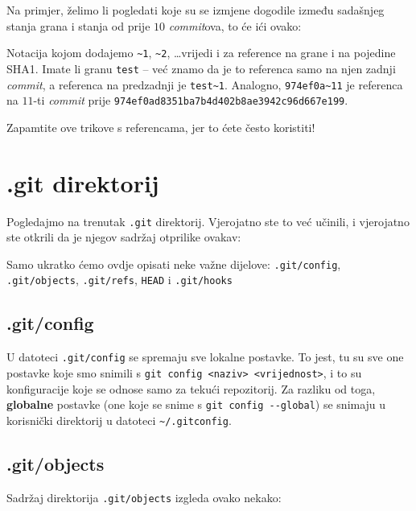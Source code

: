 Na primjer, želimo li pogledati koje su se izmjene dogodile između sadašnjeg stanja grana i stanja od prije $10$ \emph{commit}ova, to će ići ovako:


Notacija kojom dodajemo \verb+~1+, \verb+~2+, \dots vrijedi i za reference na grane i na pojedine SHA1.
Imate li granu \verb+test+ -- već znamo da je to referenca samo na njen zadnji \emph{commit}, a referenca na predzadnji je \verb+test~1+.
Analogno, \verb+974ef0a~11+ je referenca na $11$-ti \emph{commit} prije \verb+974ef0ad8351ba7b4d402b8ae3942c96d667e199+.

Zapamtite ove trikove s referencama, jer to ćete često koristiti!

\section*{.git direktorij}

Pogledajmo na trenutak \verb+.git+ direktorij. 
Vjerojatno ste to već učinili, i vjerojatno ste otkrili da je njegov sadržaj otprilike ovakav:



Samo ukratko ćemo ovdje opisati neke važne dijelove: \verb+.git/config+, \verb+.git/objects+, \verb+.git/refs+, \verb+HEAD+ i \verb+.git/hooks+

\subsection*{.git/config}

U datoteci \verb+.git/config+ se spremaju sve lokalne postavke.
To jest, tu su sve one postavke koje smo snimili s \verb+git config <naziv> <vrijednost>+, i to su konfiguracije koje se odnose samo za tekući repozitorij.
Za razliku od toga, \textbf{globalne} postavke (one koje se snime s \verb+git config --global+) se snimaju u korisnički direktorij u datoteci \verb+~/.gitconfig+.

\subsection*{.git/objects}

Sadržaj direktorija \verb+.git/objects+ izgleda ovako nekako:



